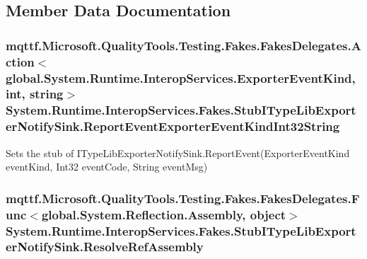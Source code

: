 \subsection{Member Data Documentation}
\hypertarget{class_system_1_1_runtime_1_1_interop_services_1_1_fakes_1_1_stub_i_type_lib_exporter_notify_sink_ab47ba0b792f0aa2647aefbec8f87b684}{
\subsubsection[{Report\-Event\-Exporter\-Event\-Kind\-Int32\-String}]{\setlength{\rightskip}{0pt plus 5cm}mqttf.\-Microsoft.\-Quality\-Tools.\-Testing.\-Fakes.\-Fakes\-Delegates.\-Action$<$global.\-System.\-Runtime.\-Interop\-Services.\-Exporter\-Event\-Kind, int, string$>$ System.\-Runtime.\-Interop\-Services.\-Fakes.\-Stub\-I\-Type\-Lib\-Exporter\-Notify\-Sink.\-Report\-Event\-Exporter\-Event\-Kind\-Int32\-String}}\label{class_system_1_1_runtime_1_1_interop_services_1_1_fakes_1_1_stub_i_type_lib_exporter_notify_sink_ab47ba0b792f0aa2647aefbec8f87b684}


Sets the stub of I\-Type\-Lib\-Exporter\-Notify\-Sink.\-Report\-Event(\-Exporter\-Event\-Kind event\-Kind, Int32 event\-Code, String event\-Msg)

\hypertarget{class_system_1_1_runtime_1_1_interop_services_1_1_fakes_1_1_stub_i_type_lib_exporter_notify_sink_ad301d2da53cf3abe50ef5e29d2690eb9}{
\subsubsection[{Resolve\-Ref\-Assembly}]{\setlength{\rightskip}{0pt plus 5cm}mqttf.\-Microsoft.\-Quality\-Tools.\-Testing.\-Fakes.\-Fakes\-Delegates.\-Func$<$global.\-System.\-Reflection.\-Assembly, object$>$ System.\-Runtime.\-Interop\-Services.\-Fakes.\-Stub\-I\-Type\-Lib\-Exporter\-Notify\-Sink.\-Resolve\-Ref\-Assembly}}\label{class_system_1_1_runtime_1_1_interop_services_1_1_fakes_1_1_stub_i_type_lib_exporter_notify_sink_ad301d2da53cf3abe50ef5e29d2690eb9}


